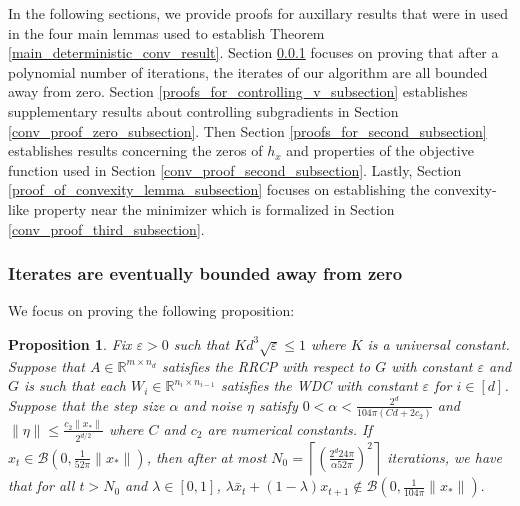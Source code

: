 \documentclass[11pt]{article}
\renewcommand{\epsilon}{\varepsilon}
\newcommand{\R}{\mathbb{R}}
\newcommand{\al}{\alpha}
\newcommand{\G}{G}
\newtheorem{prop}{Proposition}
\theoremstyle{remark}
\begin{document}
In the following sections, we provide proofs for auxillary results that were in used in the four main lemmas used to establish Theorem \ref{main_deterministic_conv_result}. Section \ref{bounded_iterates_subsection} focuses on proving that after a polynomial number of iterations, the iterates of our algorithm are all bounded away from zero. Section \ref{proofs_for_controlling_v_subsection} establishes supplementary results about controlling subgradients in Section \ref{conv_proof_zero_subsection}. Then Section \ref{proofs_for_second_subsection} establishes results concerning the zeros of $h_x$ and properties of the objective function used in Section \ref{conv_proof_second_subsection}. Lastly, Section \ref{proof_of_convexity_lemma_subsection} focuses on establishing the convexity-like property near the minimizer which is formalized in Section \ref{conv_proof_third_subsection}.

\subsubsection{Iterates are eventually bounded away from zero} \label{bounded_iterates_subsection}

 We focus on proving the following proposition:
 \begin{prop}  \label{bounded_iterates} Fix $\epsilon > 0$ such that $Kd^3 \sqrt{\epsilon} \leqslant 1$ where $K$ is a universal constant. Suppose that $A \in \R^{m \times n_d}$ satisfies the RRCP with respect to $\G$ with constant $\epsilon$ and $\G$ is such that each $W_i \in \R^{n_i \times n_{i-1}}$ satisfies the WDC with constant $\epsilon$ for $i \in [d]$. Suppose that the step size $\al$ and noise $\eta$ satisfy $0 < \al < \frac{2^d}{104\pi (Cd+2c_2)}$ and $\|\eta\| \leqslant \frac{c_2\|x_*\|}{2^{d/2}}$ where $C$ and $c_2$ are numerical constants. If $x_t \in \mathcal{B}(0,\frac{1}{52\pi}\|x_*\|)$, then after at most $N_0 = \left\lceil\left(\frac{2^d24\pi}{\al 52\pi}\right)^2\right\rceil$ iterations, we have that for all $t > N_0$ and $\lambda \in [0,1]$, $\lambda \bar{x}_t + (1-\lambda)x_{t+1} \notin \mathcal{B}(0, \frac{1}{104\pi}\|x_*\|).$
\end{prop}
 
\end{document}
